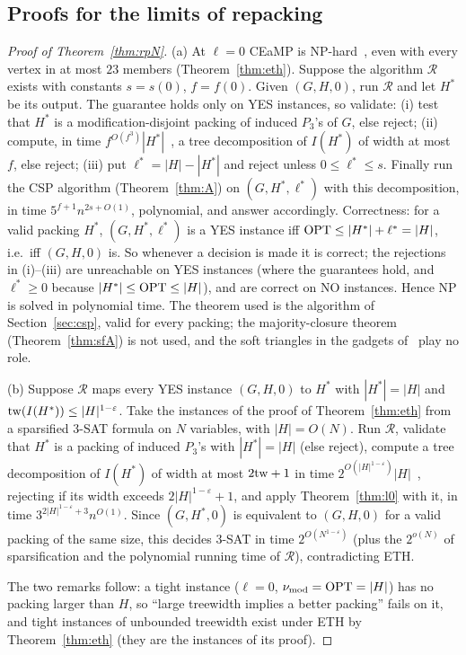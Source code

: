 \subsection{Proofs for the limits of repacking}
\begin{proof}[Proof of Theorem~\ref{thm:rpN}]
(a) At $\ell=0$ CEaMP is NP-hard~\cite[Thm.~1]{LPS23}, even with every vertex in at most $23$ members (Theorem~\ref{thm:eth}). Suppose the algorithm $\mathcal R$ exists with constants $s=s(0)$, $f=f(0)$. Given $(G,H,0)$, run $\mathcal R$ and let $H^*$ be its output. The guarantee holds only on YES instances, so validate: (i) test that $H^*$ is a modification-disjoint packing of induced $P_3$'s of $G$, else reject; (ii) compute, in time $f^{O(f^3)}|H^*|$~\cite{Bod96}, a tree decomposition of $I(H^*)$ of width at most $f$, else reject; (iii) put $\ell^*=|H|-|H^*|$ and reject unless $0\le\ell^*\le s$. Finally run the CSP algorithm (Theorem~\ref{thm:A}) on $(G,H^*,\ell^*)$ with this decomposition, in time $5^{f+1}n^{2s+O(1)}$, polynomial, and answer accordingly. Correctness: for a valid packing $H^*$, $(G,H^*,\ell^*)$ is a YES instance iff $\mathrm{OPT}\le|H^*|+\ell^*=|H|$, i.e.\ iff $(G,H,0)$ is. So whenever a decision is made it is correct; the rejections in (i)--(iii) are unreachable on YES instances (where the guarantees hold, and $\ell^*\ge0$ because $|H^*|\le\mathrm{OPT}\le|H|$), and are correct on NO instances. Hence NP is solved in polynomial time. The theorem used is the algorithm of Section~\ref{sec:csp}, valid for every packing; the majority-closure theorem (Theorem~\ref{thm:sfA}) is not used, and the soft triangles in the gadgets of~\cite{LPS23} play no role.

(b) Suppose $\mathcal R$ maps every YES instance $(G,H,0)$ to $H^*$ with $|H^*|=|H|$ and $\mathrm{tw}(I(H^*))\le|H|^{1-\varepsilon}$. Take the instances of the proof of Theorem~\ref{thm:eth} from a sparsified 3-SAT formula on $N$ variables, with $|H|=O(N)$. Run $\mathcal R$, validate that $H^*$ is a packing of induced $P_3$'s with $|H^*|=|H|$ (else reject), compute a tree decomposition of $I(H^*)$ of width at most $2\mathrm{tw}+1$ in time $2^{O(|H|^{1-\varepsilon})}|H|$~\cite{Kor21}, rejecting if its width exceeds $2|H|^{1-\varepsilon}+1$, and apply Theorem~\ref{thm:l0} with it, in time $3^{2|H|^{1-\varepsilon}+3}n^{O(1)}$. Since $(G,H^*,0)$ is equivalent to $(G,H,0)$ for a valid packing of the same size, this decides 3-SAT in time $2^{O(N^{1-\varepsilon})}$ (plus the $2^{o(N)}$ of sparsification and the polynomial running time of $\mathcal R$), contradicting ETH.

The two remarks follow: a tight instance ($\ell=0$, $\nu_{\mathrm{mod}}=\mathrm{OPT}=|H|$) has no packing larger than $H$, so ``large treewidth implies a better packing'' fails on it, and tight instances of unbounded treewidth exist under ETH by Theorem~\ref{thm:eth} (they are the instances of its proof).
\end{proof}

